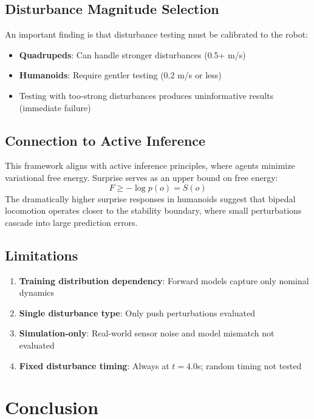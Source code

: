 \documentclass[11pt,a4paper]{article}
\begin{document}
\subsection{Disturbance Magnitude Selection}

An important finding is that disturbance testing must be calibrated to the robot:
\begin{itemize}
    \item \textbf{Quadrupeds}: Can handle stronger disturbances (0.5+ m/s)
    \item \textbf{Humanoids}: Require gentler testing (0.2 m/s or less)
    \item Testing with too-strong disturbances produces uninformative results (immediate failure)
\end{itemize}

\subsection{Connection to Active Inference}

This framework aligns with active inference principles, where agents minimize variational free energy. Surprise serves as an upper bound on free energy:
\begin{equation}
    F \geq -\log p(o) = S(o)
\end{equation}
The dramatically higher surprise responses in humanoids suggest that bipedal locomotion operates closer to the stability boundary, where small perturbations cascade into large prediction errors.

\subsection{Limitations}

\begin{enumerate}
    \item \textbf{Training distribution dependency}: Forward models capture only nominal dynamics
    \item \textbf{Single disturbance type}: Only push perturbations evaluated
    \item \textbf{Simulation-only}: Real-world sensor noise and model mismatch not evaluated
    \item \textbf{Fixed disturbance timing}: Always at $t=4.0$s; random timing not tested
\end{enumerate}

\section{Conclusion}
\end{document}
